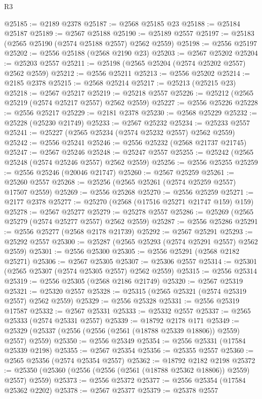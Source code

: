 \begin{lexlean}{R3}
\begin{coremodule}
@25185 := @2189 @2378
@25187 := @2568 @25185 @23
@25188 := @25184 @25187
@25189 := @2567 @25188
@25190 := @25189 @2557
@25197 := @25183 (@2565 @25190 (@2574 @25188 @2557) @2562 @2559)
@25198 := @2556 @25197
@25202 := @2556 @25188 (@2568 @2190 @23)
@25203 := @2567 @25202
@25204 := @25203 @2557
@25211 := @25198 (@2565 @25204 (@2574 @25202 @2557) @2562 @2559)
@25212 := @2556 @25211
@25213 := @2556 @25202
@25214 := @2185 @2378
@25215 := @2568 @25214
@25217 := @25213 (@25215 @23)
@25218 := @2567 @25217
@25219 := @25218 @2557
@25226 := @25212 (@2565 @25219 (@2574 @25217 @2557) @2562 @2559)
@25227 := @2556 @25226
@25228 := @2556 @25217
@25229 := @2181 @2378
@25230 := @2568 @25229
@25232 := @25228 (@25230 @21749)
@25233 := @2567 @25232
@25234 := @25233 @2557
@25241 := @25227 (@2565 @25234 (@2574 @25232 @2557) @2562 @2559)
@25242 := @2556 @25241
@25246 := @2556 @25232 (@2568 @21737 @21745)
@25247 := @2567 @25246
@25248 := @25247 @2557
@25255 := @25242 (@2565 @25248 (@2574 @25246 @2557) @2562 @2559)
@25256 := @2556 @25255
@25259 := @2556 @25246 (@20046 @21747)
@25260 := @2567 @25259
@25261 := @25260 @2557
@25268 := @25256 (@2565 @25261 (@2574 @25259 @2557) @17507 @2559)
@25269 := @2556 @25268
@25270 := @2556 @25259
@25271 := @2177 @2378
@25277 := @25270 (@2568 (@17516 @25271 @21747 @159) @159)
@25278 := @2567 @25277
@25279 := @25278 @2557
@25286 := @25269 (@2565 @25279 (@2574 @25277 @2557) @2562 @2559)
@25287 := @2556 @25286
@25291 := @2556 @25277 (@2568 @2178 @21739)
@25292 := @2567 @25291
@25293 := @25292 @2557
@25300 := @25287 (@2565 @25293 (@2574 @25291 @2557) @2562 @2559)
@25301 := @2556 @25300
@25305 := @2556 @25291 (@2568 @2182 @25271)
@25306 := @2567 @25305
@25307 := @25306 @2557
@25314 := @25301 (@2565 @25307 (@2574 @25305 @2557) @2562 @2559)
@25315 := @2556 @25314
@25319 := @2556 @25305 (@2568 @2186 @21749)
@25320 := @2567 @25319
@25321 := @25320 @2557
@25328 := @25315 (@2565 @25321 (@2574 @25319 @2557) @2562 @2559)
@25329 := @2556 @25328
@25331 := @2556 @25319 @17587
@25332 := @2567 @25331
@25333 := @25332 @2557
@25337 := @2565 @25333 (@2574 @25331 @2557)
@25339 := @18792 @2178 @171
@25349 := @25329 (@25337 (@2556 (@2556 (@2561 (@18788 @25339 @18806)) @2559) @2557) @2559)
@25350 := @2556 @25349
@25354 := @2556 @25331 (@17584 @25339 @2198)
@25355 := @2567 @25354
@25356 := @25355 @2557
@25360 := @2565 @25356 (@2574 @25354 @2557)
@25362 := @18792 @2182 @2198
@25372 := @25350 (@25360 (@2556 (@2556 (@2561 (@18788 @25362 @18806)) @2559) @2557) @2559)
@25373 := @2556 @25372
@25377 := @2556 @25354 (@17584 @25362 @2202)
@25378 := @2567 @25377
@25379 := @25378 @2557

\end{coremodule}
\end{lexlean}
